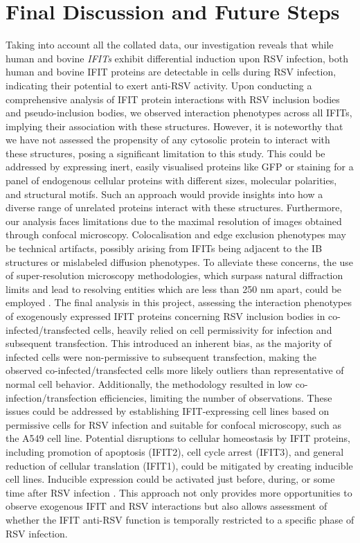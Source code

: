 \chapter{Final Discussion and Future Steps} \label{ch:Final Discussion and Future Steps}
Taking into account all the collated data, our investigation reveals that while human and bovine \textit{IFITs} exhibit differential induction upon RSV infection, both human and bovine IFIT proteins are detectable in cells during RSV infection, indicating their potential to exert anti-RSV activity. Upon conducting a comprehensive analysis of IFIT protein interactions with RSV inclusion bodies and pseudo-inclusion bodies, we observed interaction phenotypes across all IFITs, implying their association with these structures. However, it is noteworthy that we have not assessed the propensity of any cytosolic protein to interact with these structures, posing a significant limitation to this study. This could be addressed by expressing inert, easily visualised proteins like GFP or staining for a panel of endogenous cellular proteins with different sizes, molecular polarities, and structural motifs. Such an approach would provide insights into how a diverse range of unrelated proteins interact with these structures. Furthermore, our analysis faces limitations due to the maximal resolution of images obtained through confocal microscopy. Colocalisation and edge exclusion phenotypes may be technical artifacts, possibly arising from IFITs being adjacent to the IB structures or mislabeled diffusion phenotypes. To alleviate these concerns, the use of super-resolution microscopy methodologies, which surpass natural diffraction limits and lead to resolving entities which are less than 250 nm apart, could be employed \cite{Schermelleh2019Super-resolutionDemystified}. The final analysis in this project, assessing the interaction phenotypes of exogenously expressed IFIT proteins concerning RSV inclusion bodies in co-infected/transfected cells, heavily relied on cell permissivity for infection and subsequent transfection. This introduced an inherent bias, as the majority of infected cells were non-permissive to subsequent transfection, making the observed co-infected/transfected cells more likely outliers than representative of normal cell behavior. Additionally, the methodology resulted in low co-infection/transfection efficiencies, limiting the number of observations. These issues could be addressed by establishing IFIT-expressing cell lines based on permissive cells for RSV infection and suitable for confocal microscopy, such as the A549 cell line. Potential disruptions to cellular homeostasis by IFIT proteins, including promotion of apoptosis (IFIT2), cell cycle arrest (IFIT3), and general reduction of cellular translation (IFIT1), could be mitigated by creating inducible cell lines. Inducible expression could be activated just before, during, or some time after RSV infection \cite{Kallunki2019HowStudies}. This approach not only provides more opportunities to observe exogenous IFIT and RSV interactions but also allows assessment of whether the IFIT anti-RSV function is temporally restricted to a specific phase of RSV infection.

